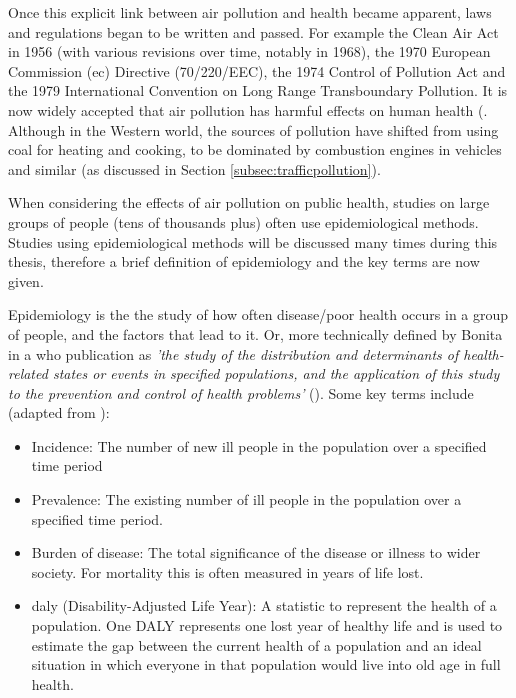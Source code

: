 
Once this explicit link between air pollution and health became apparent, laws and regulations began to be written and passed. For example the Clean Air Act in 1956 (with various revisions over time, notably in 1968), the 1970 European Commission (\gls{ec}) Directive (70/220/EEC), the 1974 Control of Pollution Act and the 1979 International Convention on Long Range Transboundary Pollution.
It is now widely accepted that air pollution has harmful effects on human health (\cite{WorldHealthOrganization2013}. Although in the Western world, the sources of pollution have shifted from using coal for heating and cooking, to be dominated by combustion engines in vehicles and similar (as discussed in Section \ref{subsec:trafficpollution}).


When considering the effects of air pollution on public health, studies on large groups of people (tens of thousands plus) often use epidemiological methods. Studies using epidemiological methods will be discussed many times during this thesis, therefore a brief definition of epidemiology and the key terms are now given.

Epidemiology is the the study of how often disease/poor health occurs in a group of people, and the factors that lead to it. Or, more technically defined by Bonita in a \gls{who} publication as \textit{'the study of the distribution and determinants of health-related states or events in specified populations, and the application of this study to the prevention and control of health problems'} (\cite{Bonita2006}). Some key terms include (adapted from \cite{U.S.DepartmentofHealth&HumanServices2014}):

\begin{itemize}
\item Incidence: The number of new ill people in the population over a specified time period
\item Prevalence: The existing number of ill people in the population over a specified time period.
\item Burden of disease: The total significance of the disease or illness to wider society. For mortality this is often measured in years of life lost.
\item \gls{daly} (Disability-Adjusted Life Year): A statistic to represent the health of a population. One DALY represents one lost year of healthy life and is used to estimate the gap between the current health of a population and an ideal situation in which everyone in that population would live into old age in full health.
\end{itemize}

